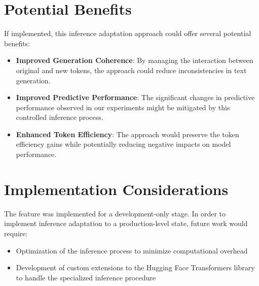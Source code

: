 \section{Potential Benefits}
If implemented, this inference adaptation approach could offer several potential benefits:

\begin{itemize}
    \item \textbf{Improved Generation Coherence}: By managing the interaction between original and new tokens, the approach could reduce inconsistencies in text generation. 
    
    \item \textbf{Improved Predictive Performance}: The significant changes in predictive performance observed in our experiments might be mitigated by this controlled inference process. 
    
    \item \textbf{Enhanced Token Efficiency}: The approach would preserve the token efficiency gains while potentially reducing negative impacts on model performance. 
\end{itemize}

\section{Implementation Considerations}
The feature was implemented for a development-only stage. In order to implement inference adaptation to a production-level state, future work would require:

\begin{itemize}
    \item Optimization of the inference process to minimize computational overhead
    
    \item Development of custom extensions to the Hugging Face Transformers library to handle the specialized inference procedure
    
\end{itemize}
